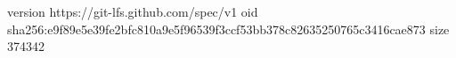 version https://git-lfs.github.com/spec/v1
oid sha256:e9f89e5e39fe2bfc810a9e5f96539f3ccf53bb378c82635250765c3416cae873
size 374342
